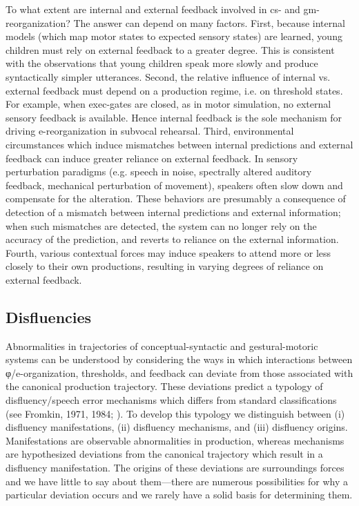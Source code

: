   To what extent are internal and external feedback involved in cs- and gm- reorganization? The answer can depend on many factors. First, because internal models (which map motor states to expected sensory states) are learned, young children must rely on external feedback to a greater degree. This is consistent with the observations that young children speak more slowly and produce syntactically simpler utterances. Second, the relative influence of internal vs. external feedback must depend on a production regime, i.e. on threshold states. For example, when exec-gates are closed, as in motor simulation, no external sensory feedback is available. Hence internal feedback is the sole mechanism for driving e-reorganization in subvocal rehearsal. Third, environmental circumstances which induce mismatches between internal predictions and external feedback can induce greater reliance on external feedback. In sensory perturbation paradigms (e.g. speech in noise, spectrally altered auditory feedback, mechanical perturbation of movement), speakers often slow down and compensate for the alteration. These behaviors are presumably a consequence of detection of a mismatch between internal predictions and external information; when such mismatches are detected, the system can no longer rely on the accuracy of the prediction, and reverts to reliance on the external information. Fourth, various contextual forces may induce speakers to attend more or less closely to their own productions, resulting in varying degrees of reliance on external feedback.

\subsection{Disfluencies}

Abnormalities in trajectories of conceptual-syntactic and gestural-motoric systems can be understood by considering the ways in which interactions between φ/e-organization, thresholds, and feedback can deviate from those associated with the canonical production trajectory. These deviations predict a typology of disfluency/speech error mechanisms which differs from standard classifications (see Fromkin, 1971, 1984; \citealt{Shriberg2001}). To develop this typology we distinguish between (i) disfluency manifestations, (ii) disfluency mechanisms, and (iii) disfluency origins. Manifestations are observable abnormalities in production, whereas mechanisms are hypothesized deviations from the canonical trajectory which result in a disfluency manifestation. The origins of these deviations are surroundings forces and we have little to say about them—there are numerous possibilities for why a particular deviation occurs and we rarely have a solid basis for determining them. 

